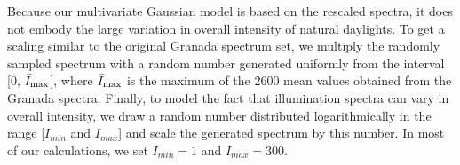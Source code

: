 \documentclass{jov}
\begin{document}
Because our multivariate Gaussian model is based on the rescaled spectra, it does not embody the large variation in overall intensity of natural daylights.
To get a scaling similar to the original Granada spectrum set, we multiply the randomly sampled spectrum with a random number generated uniformly from the interval [0, $\bar{I}_{\rm max}$], where $\bar{I}_{\rm max}$ is the maximum of the 2600 mean values obtained from the Granada spectra. Finally, to model the fact that illumination spectra can vary in overall intensity, we draw a random number distributed logarithmically in the range [$I_{min}$ and $I_{max}$] and scale the generated spectrum by this number.
In most of our calculations, we set $I_{min} = 1$ and $I_{max} = 300$.
\end{document}
